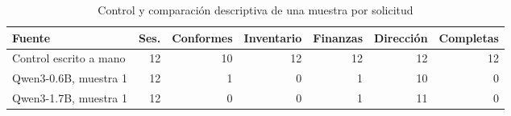 \begin{table}[!t]
\caption{Control y comparación descriptiva de una muestra por solicitud}
\label{tab:controls_models}\centering\footnotesize
\begin{tabular*}{\textwidth}{@{\extracolsep{\fill}}lrrrrrr}\hline
Fuente & Ses. & Conformes & Inventario & Finanzas & Dirección & Completas\\\hline
Control escrito a mano & 12 & 10 & 12 & 12 & 12 & 12\\
Qwen3-0.6B, muestra 1 & 12 & 1 & 0 & 1 & 10 & 0\\
Qwen3-1.7B, muestra 1 & 12 & 0 & 0 & 1 & 11 & 0\\
\hline\end{tabular*}\end{table}
